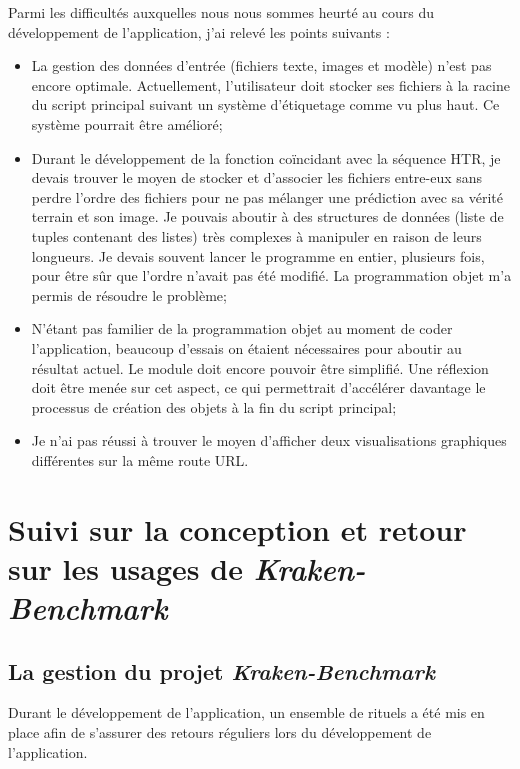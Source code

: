 Parmi les difficultés auxquelles nous nous sommes heurté au cours du développement de l'application, j'ai relevé les points suivants :

\begin{itemize}
    \item La gestion des données d'entrée (fichiers texte, images et modèle) n'est pas encore optimale. Actuellement, l'utilisateur doit stocker ses fichiers à la racine du script principal suivant un système d'étiquetage comme vu plus haut. Ce système pourrait être amélioré;
    \item Durant le développement de la fonction coïncidant avec la séquence HTR, je devais trouver le moyen de stocker et d'associer les fichiers entre-eux sans perdre l'ordre des fichiers pour ne pas mélanger une prédiction avec sa vérité terrain et son image. Je pouvais aboutir à des structures de données (liste de tuples contenant des listes) très complexes à manipuler en raison de leurs longueurs. Je devais souvent lancer le programme en entier, plusieurs fois, pour être sûr que l'ordre n'avait pas été modifié. La programmation objet m'a permis de résoudre le problème;
    \item N'étant pas familier de la programmation objet au moment de coder l'application, beaucoup d'essais on étaient nécessaires pour aboutir au résultat actuel. Le module  doit encore pouvoir être simplifié. Une réflexion doit être menée sur cet aspect, ce qui permettrait d'accélérer davantage le processus de création des objets à la fin du script principal;
    \item Je n'ai pas réussi à trouver le moyen d'afficher deux visualisations graphiques différentes sur la même route URL. 
\end{itemize}

\section{Suivi sur la conception et retour sur les usages de \textit{Kraken-Benchmark}}

\subsection{La gestion du projet \textit{Kraken-Benchmark}}\label{gestion_projet}

Durant le développement de l'application, un ensemble de rituels a été mis en place afin de s'assurer des retours réguliers lors du développement de l'application.\\

